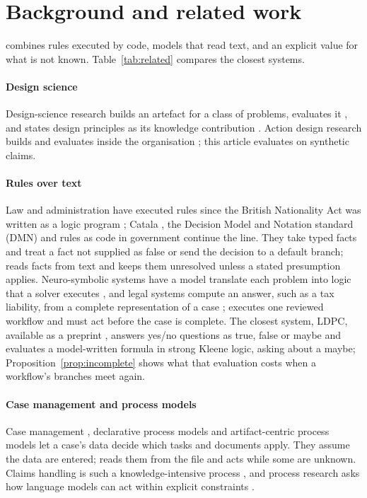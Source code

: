 \section{Background and related work}
\label{sec:related}

\casepath combines rules executed by code, models that read text, and an explicit value for what is not known. Table~\ref{tab:related} compares the closest systems.

\paragraph{Design science}
Design-science research builds an artefact for a class of problems, evaluates it \cite{hevner2004design,peffers2007design}, and states design principles as its knowledge contribution \cite{gregor2013positioning}. Action design research builds and evaluates inside the organisation \cite{sein2011action}; this article evaluates on synthetic claims.

\paragraph{Rules over text}
Law and administration have executed rules since the British Nationality Act was written as a logic program \cite{sergot1986british}; Catala \cite{merigoux2021catala}, the Decision Model and Notation standard (DMN) \cite{omg2024dmn} and rules as code in government \cite{mohun2020cracking} continue the line. They take typed facts and treat a fact not supplied as false \cite{reiter1978closed} or send the decision to a default branch; \casepath reads facts from text and keeps them unresolved unless a stated presumption applies. Neuro-symbolic systems have a model translate each problem into logic that a solver executes \cite{pan2023logic,olausson2023linc,ye2023satlm,gao2023pal}, and legal systems compute an answer, such as a tax liability, from a complete representation of a case \cite{holzenberger2023connecting,jurayj2026tax,kant2024equitable}; \casepath executes one reviewed workflow and must act before the case is complete. The closest system, LDPC, available as a preprint \cite{erwin2025ldpc}, answers yes/no questions as true, false or maybe and evaluates a model-written formula in strong Kleene logic, asking about a maybe; Proposition~\ref{prop:incomplete} shows what that evaluation costs when a workflow's branches meet again.

\paragraph{Case management and process models}
Case management \cite{omg2016cmmn}, declarative process models \cite{pesic2006declarative} and artifact-centric process models \cite{hull2008artifact} let a case's data decide which tasks and documents apply. They assume the data are entered; \casepath reads them from the file and acts while some are unknown. Claims handling is such a knowledge-intensive process \cite{diciccio2015knowledge,eling2018impact,eling2022impact}, and process research asks how language models can act within explicit constraints \cite{dumas2023aiaugmented,vidgof2023large,kampik2025large,konig2025unstructured,li2025textual}.

